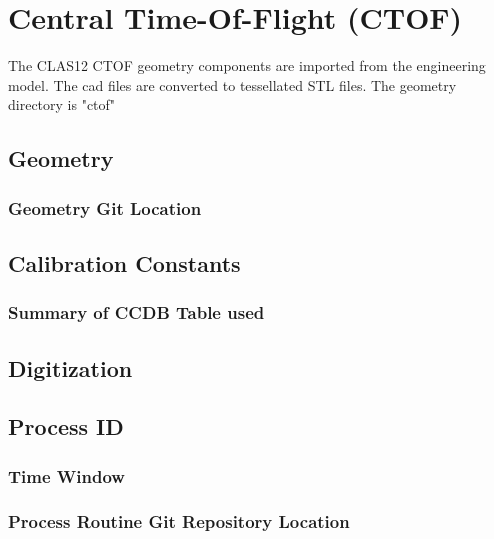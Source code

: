 \section{Central Time-Of-Flight (CTOF)}

The CLAS12 CTOF geometry components are imported from the engineering model. The cad files are converted to tessellated STL files.
The geometry directory is "ctof"

\subsection{Geometry}

\subsubsection{Geometry Git Location}

\subsection{Calibration Constants}

\subsubsection{Summary of CCDB Table used}

\subsection{Digitization}

\subsection{Process ID}

\subsubsection{Time Window}

\subsubsection{Process Routine Git Repository Location}


